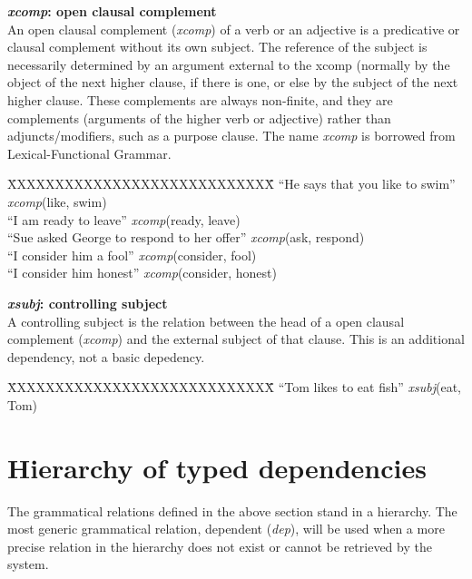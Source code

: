 \documentclass[11pt,letterpaper]{article}
\begin{document}
\noindent\textbf{\emph{xcomp}: open clausal complement}\\
An open clausal complement (\emph{xcomp}) of a verb or an adjective is
a predicative or clausal complement without its own subject. The
reference of the subject is necessarily determined by an argument
external to the xcomp (normally by the object of the next higher
clause, if there is one, or else by the subject of the next higher clause.
These complements are always non-finite, and they are complements
(arguments of the higher verb or adjective) rather than
adjuncts/modifiers, such as a purpose clause.
The name \emph{xcomp} is borrowed from Lexical-Functional Grammar.
\begin{tabbing}
	\hspace{1cm} \=XXXXXXXXXXXXXXXXXXXXXXXXXXXX\= \hspace{1cm}\=  \kill
\>  ``He says that you like to swim'' \> \> \emph{xcomp}(like, swim)\\
\hspace{1cm} \> ``I am ready to leave'' \> \>  \emph{xcomp}(ready, leave)\\
\> ``Sue asked George to respond to her offer'' \> \> \emph{xcomp}(ask, respond) \\
\> ``I consider him a fool'' \> \> \emph{xcomp}(consider, fool) \\
\> ``I consider him honest'' \> \> \emph{xcomp}(consider, honest) \\
\end{tabbing}

\noindent\textbf{\emph{xsubj}: controlling subject}\\
A controlling subject is the relation between the head of a open clausal complement (\emph{xcomp}) and the external subject of that clause.
This is an additional dependency, not a basic depedency.
\begin{tabbing}
	\hspace{1cm} \=XXXXXXXXXXXXXXXXXXXXXXXXXXXX\= \hspace{1cm}\=  \kill
\> ``Tom likes to eat fish'' \> \> \emph{xsubj}(eat, Tom)\\
\end{tabbing}

\section{Hierarchy of typed dependencies}\label{hierarchy}
The grammatical relations defined in the above section stand in a hierarchy. The most generic grammatical relation, dependent (\emph{dep}), will be used when a more precise relation in the hierarchy does not exist or cannot be retrieved by the system.
\end{document}
